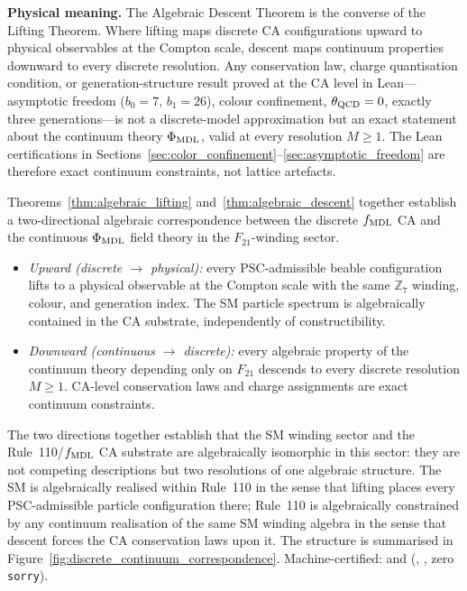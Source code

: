 \noindent\textbf{Physical meaning.}
The Algebraic Descent Theorem is the converse of the Lifting Theorem.
Where lifting maps discrete CA configurations upward to physical observables at the Compton scale, descent maps continuum properties downward to every discrete resolution.
Any conservation law, charge quantisation condition, or generation-structure result proved at the CA level in Lean---asymptotic freedom ($b_0 = 7$, $b_1 = 26$), colour confinement, $\theta_{\rm QCD} = 0$, exactly three generations---is not a discrete-model approximation but an exact statement about the continuum theory $\Phi_{\rm MDL}$, valid at every resolution $M \geq 1$.
The Lean certifications in Sections~\ref{sec:color_confinement}--\ref{sec:asymptotic_freedom} are therefore exact continuum constraints, not lattice artefacts.

\begin{remark}
\label{rem:discrete_continuum_correspondence}
Theorems~\ref{thm:algebraic_lifting} and~\ref{thm:algebraic_descent} together establish a two-directional algebraic correspondence between the discrete $f_{\rm MDL}$ CA and the continuous $\Phi_{\rm MDL}$ field theory in the $F_{21}$-winding sector.
\begin{itemize}
\item \emph{Upward (discrete $\to$ physical):} every PSC-admissible beable configuration lifts to a physical observable at the Compton scale with the same $\mathbb{Z}_7$ winding, colour, and generation index. The SM particle spectrum is algebraically contained in the CA substrate, independently of constructibility.
\item \emph{Downward (continuous $\to$ discrete):} every algebraic property of the continuum theory depending only on $F_{21}$ descends to every discrete resolution $M \geq 1$. CA-level conservation laws and charge assignments are exact continuum constraints.
\end{itemize}
The two directions together establish that the SM winding sector and the Rule~110/$f_{\rm MDL}$ CA substrate are algebraically isomorphic in this sector: they are not competing descriptions but two resolutions of one algebraic structure.
The SM is algebraically realised within Rule~110 in the sense that lifting places every PSC-admissible particle configuration there; Rule~110 is algebraically constrained by any continuum realisation of the same SM winding algebra in the sense that descent forces the CA conservation laws upon it.
The structure is summarised in Figure~\ref{fig:discrete_continuum_correspondence}.
Machine-certified:  and 
(, , zero \texttt{sorry}).
\end{remark}

